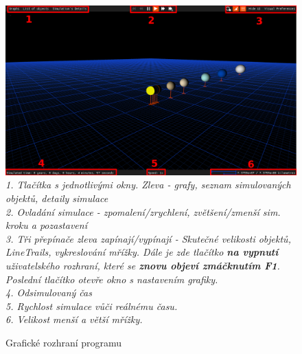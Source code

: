 \begin{landscape}
\begin{figure}[ht]
	\caption{Grafické rozhraní programu}
	\centering
	\includegraphics[width=\linewidth,keepaspectratio]{Figs/Overview}\\
	\textit{1. Tlačítka s jednotlivými okny. Zleva - grafy, seznam simulovaných objektů, detaily simulace}\\
	\textit{2. Ovladání simulace - zpomalení/zrychlení, zvětšení/zmenší sim. kroku a pozastavení}\\
	\textit{3. Tři přepínače zleva zapínají/vypínají - Skutečné velikosti objektů, LineTrails, vykreslování mřížky. Dále je zde tlačítko \textbf{na vypnutí} uživatelského rozhraní, které se \textbf{ znovu objeví zmáčknutím F1}. Poslední tlačítko otevře okno s nastavením grafiky. }\\
	\textit{4. Odsimulovaný čas \\ 5. Rychlost simulace vůči reálnému času.}\\
	\textit{6. Velikost menší a větší mřížky.}
\end{figure}


\end{landscape}
